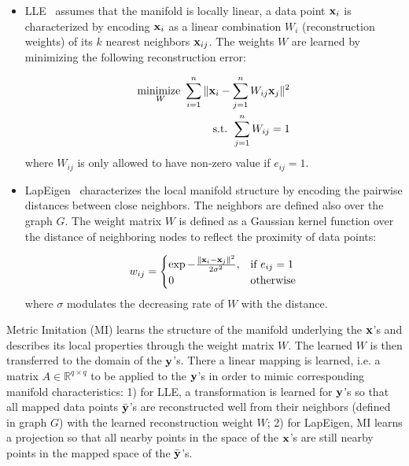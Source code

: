 \documentclass[10pt,twocolumn,letterpaper]{article}
\begin{document}
\begin{enumerate} [leftmargin=4.5mm]
\begin{enumerate} [leftmargin=5mm]
   \begin{itemize} [leftmargin=4mm]
   \item LLE~\cite{lle:science00} assumes that the manifold is locally
     linear, \ie a data point ${{\mathbf x}}_i$
     is characterized by encoding ${{\mathbf x}}_i$ as a linear combination
     $W_i$ (reconstruction weights) of its $k$ nearest neighbors
     ${{\mathbf x}}_{ij}$. The weights $W$ are learned by minimizing the
     following reconstruction error: 
     
     \begin{equation}
       \label{eq:lle:error}
       \begin{aligned}
         \underset{W} {\text {minimize }} \sum_{i=1}^n \| {{\mathbf x}}_i - \sum_{j=1}^n W_{ij} {{\mathbf x}}_j \|^2 \\
        \text{s.t. }  \sum_{j=1}^n W_{ij}=1 
       \end{aligned}
     \end{equation}
     where $W_{ij}$ is only allowed to have non-zero value if
     $e_{ij}=1$. 

   \item LapEigen~\cite{eigenmaps:nips01} characterizes the local
     manifold structure by encoding the pairwise distances between
     close neighbors. The neighbors are defined also over the graph
     $G$. The weight matrix $W$ is defined as a Gaussian kernel
     function over the distance of neighboring nodes to reflect the
     proximity of data points: 
 
     \begin{equation}
       \label{eq:lap:wt} 
       w_{ij} = \begin{cases}  \exp{ -\frac{ \| {{\mathbf x}}_i - {{\mathbf x}}_j \| ^2} {2\sigma^2}}, &\text{if } e_{ij}=1  \\
                               0          &\text{otherwise}
                \end{cases}
     \end{equation}
     where $\sigma$ modulates the decreasing rate of $W$ with the
     distance.
   \end{itemize}

   Metric Imitation (MI) learns the structure of the manifold underlying
   the ${{\mathbf x}}$'s and describes its local properties through the weight 
   matrix $W$. The learned $W$ is then transferred to the domain of the
   ${{\mathbf y}}$'s. There a linear mapping is learned, i.e. a matrix $A \in 
   \mathbb{R}^{q \times q}$ to be applied to the ${{\mathbf y}}$'s in order to 
   mimic corresponding manifold characteristics:
   1) for LLE, a transformation is learned for ${{\mathbf y}}$'s so that
   all mapped data points $\bar{{\mathbf y}}$'s are reconstructed well from their
   neighbors (defined in graph $G$) with the learned reconstruction
   weight $W$; 2) for LapEigen, MI learns a projection so that all
   nearby points in the space of the ${{\mathbf x}}$'s are still nearby
   points in the mapped space of the $\bar{{\mathbf y}}$'s.


\end{enumerate}
\end{enumerate}
\end{document}
